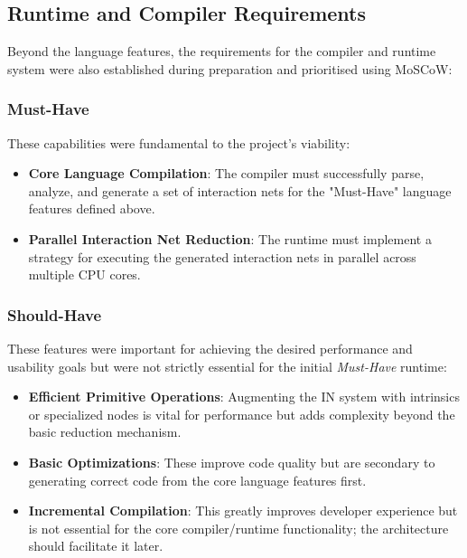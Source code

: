 \subsection{Runtime and Compiler Requirements}
Beyond the language features, the requirements for the compiler and runtime system were also established during preparation and prioritised using MoSCoW:

\subsubsection*{Must-Have}
These capabilities were fundamental to the project's viability:
\begin{itemize}
    \item \textbf{Core Language Compilation}: The compiler must successfully parse, analyze, and generate a set of interaction nets for the "Must-Have" language features defined above.
    \item \textbf{Parallel Interaction Net Reduction}: The runtime must implement a strategy for executing the generated interaction nets in parallel across multiple CPU cores.
\end{itemize}

\subsubsection*{Should-Have}
These features were important for achieving the desired performance and usability goals but were not strictly essential for the initial \textit{Must-Have} runtime:
\begin{itemize}
    \item \textbf{Efficient Primitive Operations}: Augmenting the IN system with intrinsics or specialized nodes is vital for performance but adds complexity beyond the basic reduction mechanism.
    \item \textbf{Basic Optimizations}: These improve code quality but are secondary to generating correct code from the core language features first.
    \item \textbf{Incremental Compilation}: This greatly improves developer experience but is not essential for the core compiler/runtime functionality; the architecture should facilitate it later.
\end{itemize}

